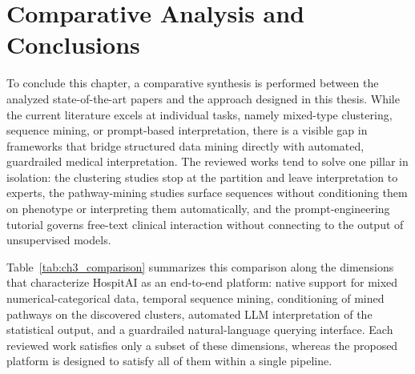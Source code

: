 \section{Comparative Analysis and Conclusions}\label{sec:rw_synthesis}

To conclude this chapter, a comparative synthesis is performed between the analyzed state-of-the-art papers and the approach designed in this thesis. While the current literature excels at individual tasks, namely mixed-type clustering, sequence mining, or prompt-based interpretation, there is a visible gap in frameworks that bridge structured data mining directly with automated, guardrailed medical interpretation. The reviewed works tend to solve one pillar in isolation: the clustering studies stop at the partition and leave interpretation to experts, the pathway-mining studies surface sequences without conditioning them on phenotype or interpreting them automatically, and the prompt-engineering tutorial governs free-text clinical interaction without connecting to the output of unsupervised models.

Table~\ref{tab:ch3_comparison} summarizes this comparison along the dimensions that characterize HospitAI as an end-to-end platform: native support for mixed numerical-categorical data, temporal sequence mining, conditioning of mined pathways on the discovered clusters, automated LLM interpretation of the statistical output, and a guardrailed natural-language querying interface. Each reviewed work satisfies only a subset of these dimensions, whereas the proposed platform is designed to satisfy all of them within a single pipeline.


